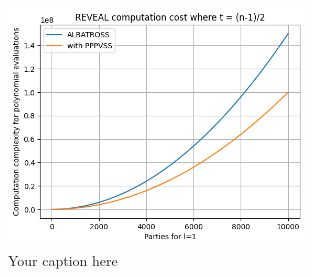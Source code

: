 \begin{figure}[htbp]
  \centering
  \includegraphics[width=0.7\textwidth]{figures/polynomial.png}
  \caption{Your caption here}
  \label{fig:your-label}
\end{figure}